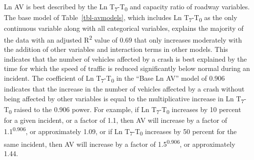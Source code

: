 \documentclass[
  letterpaper,
  authoryear]{elsarticle}
\begin{document}
Ln AV is best described by the Ln T\textsubscript{7}-T\textsubscript{0}
and capacity ratio of roadway variables. The base model of
Table~\ref{tbl-avmodels}, which includes Ln
T\textsubscript{7}-T\textsubscript{0} as the only continuous variable
along with all categorical variables, explains the majority of the data
with an adjusted R\textsuperscript{2} value of 0.69 that only increases
moderately with the addition of other variables and interaction terms in
other models. This indicates that the number of vehicles affected by a
crash is best explained by the time for which the speed of traffic is
reduced significantly below normal during an incident. The coefficient
of Ln T\textsubscript{7}-T\textsubscript{0} in the ``Base Ln AV'' model
of 0.906 indicates that the increase in the number of vehicles affected
by a crash without being affected by other variables is equal to the
multiplicative increase in Ln T\textsubscript{7}-T\textsubscript{0}
raised to the 0.906 power. For example, if Ln
T\textsubscript{7}-T\textsubscript{0} increases by 10 percent for a
given incident, or a factor of 1.1, then AV will increase by a factor of
1.1\textsuperscript{0.906}, or approximately 1.09, or if Ln
T\textsubscript{7}-T\textsubscript{0} increases by 50 percent for the
same incident, then AV will increase by a factor of
1.5\textsuperscript{0.906}, or approximately 1.44.
\end{document}
